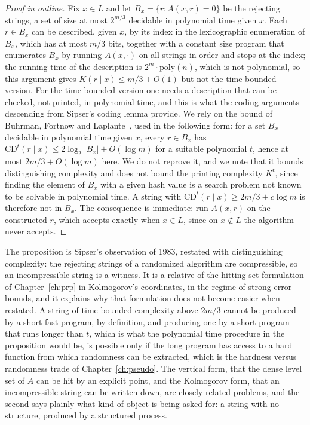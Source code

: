 \begin{proof}[Proof in outline]
Fix $x \in L$ and let $B_x = \{ r : A(x, r) = 0 \}$ be the rejecting strings, a set of size at most $2^{m/3}$ decidable in polynomial time given $x$. Each $r \in B_x$ can be described, given $x$, by its index in the lexicographic enumeration of $B_x$, which has at most $m/3$ bits, together with a constant size program that enumerates $B_x$ by running $A(x, \cdot)$ on all strings in order and stops at the index; the running time of the description is $2^m \cdot \mathrm{poly}(n)$, which is not polynomial, so this argument gives $K(r \mid x) \le m/3 + O(1)$ but not the time bounded version. For the time bounded version one needs a description that can be checked, not printed, in polynomial time, and this is what the coding arguments descending from Sipser's coding lemma \cite{Sipser} provide. We rely on the bound of Buhrman, Fortnow and Laplante~\cite{BFL}, used in the following form: for a set $B_x$ decidable in polynomial time given $x$, every $r \in B_x$ has $\mathrm{CD}^t(r \mid x) \le 2 \log_2 |B_x| + O(\log m)$ for a suitable polynomial $t$, hence at most $2m/3 + O(\log m)$ here. We do not reprove it, and we note that it bounds distinguishing complexity and does not bound the printing complexity $K^t$, since finding the element of $B_x$ with a given hash value is a search problem not known to be solvable in polynomial time. A string with $\mathrm{CD}^t(r \mid x) \ge 2m/3 + c \log m$ is therefore not in $B_x$. The consequence is immediate: run $A(x, r)$ on the constructed $r$, which accepts exactly when $x \in L$, since on $x \notin L$ the algorithm never accepts.
\end{proof}

The proposition is Sipser's observation of 1983, restated with distinguishing complexity: the rejecting strings of a randomized algorithm are compressible, so an incompressible string is a witness. It is a relative of the hitting set formulation of Chapter~\ref{ch:prp} in Kolmogorov's coordinates, in the regime of strong error bounds, and it explains why that formulation does not become easier when restated. A string of time bounded complexity above $2m/3$ cannot be produced by a short fast program, by definition, and producing one by a short program that runs longer than $t$, which is what the polynomial time procedure in the proposition would be, is possible only if the long program has access to a hard function from which randomness can be extracted, which is the hardness versus randomness trade of Chapter~\ref{ch:pseudo}. The vertical form, that the dense level set of $A$ can be hit by an explicit point, and the Kolmogorov form, that an incompressible string can be written down, are closely related problems, and the second says plainly what kind of object is being asked for: a string with no structure, produced by a structured process.

